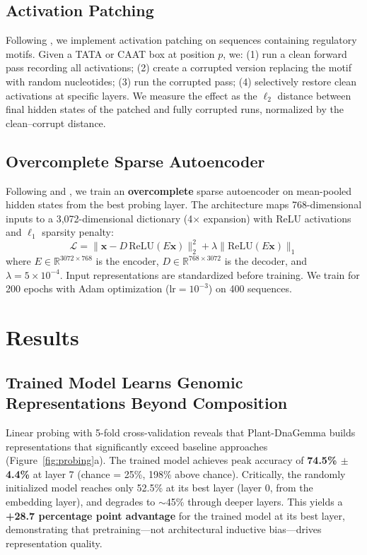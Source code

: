\documentclass{article}
\begin{document}
\subsection{Activation Patching}

Following \citet{meng2022locating}, we implement activation patching on sequences containing regulatory motifs. Given a TATA or CAAT box at position $p$, we: (1) run a clean forward pass recording all activations; (2) create a corrupted version replacing the motif with random nucleotides; (3) run the corrupted pass; (4) selectively restore clean activations at specific layers. We measure the effect as the $\ell_2$ distance between final hidden states of the patched and fully corrupted runs, normalized by the clean--corrupt distance.

\subsection{Overcomplete Sparse Autoencoder}

Following \citet{bricken2023monosemanticity} and \citet{cunningham2023sparse}, we train an \textbf{overcomplete} sparse autoencoder on mean-pooled hidden states from the best probing layer. The architecture maps 768-dimensional inputs to a 3,072-dimensional dictionary (4$\times$ expansion) with ReLU activations and $\ell_1$ sparsity penalty:
\begin{equation}
    \mathcal{L} = \| \mathbf{x} - D\,\text{ReLU}(E\mathbf{x}) \|_2^2 + \lambda \| \text{ReLU}(E\mathbf{x}) \|_1
\end{equation}
where $E \in \mathbb{R}^{3072 \times 768}$ is the encoder, $D \in \mathbb{R}^{768 \times 3072}$ is the decoder, and $\lambda = 5 \times 10^{-4}$. Input representations are standardized before training. We train for 200 epochs with Adam optimization ($\text{lr}=10^{-3}$) on 400 sequences.

\section{Results}

\subsection{Trained Model Learns Genomic Representations Beyond Composition}

Linear probing with 5-fold cross-validation reveals that Plant-DnaGemma builds representations that significantly exceed baseline approaches (Figure~\ref{fig:probing}a). The trained model achieves peak accuracy of \textbf{74.5\% $\pm$ 4.4\%} at layer 7 (chance = 25\%, 198\% above chance). Critically, the randomly initialized model reaches only 52.5\% at its best layer (layer 0, from the embedding layer), and degrades to ${\sim}$45\% through deeper layers. This yields a \textbf{+28.7 percentage point advantage} for the trained model at its best layer, demonstrating that pretraining---not architectural inductive bias---drives representation quality.
\end{document}
